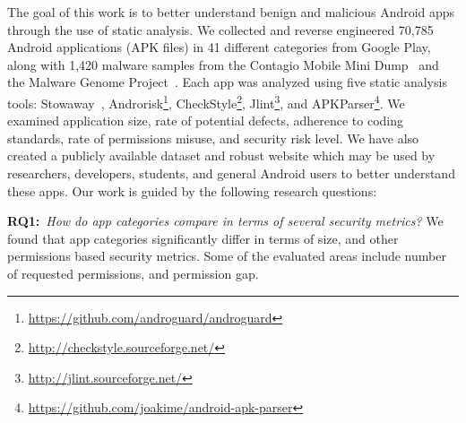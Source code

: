 \documentclass{sig-alternate-05-2015}
\begin{document}

The goal of this work is to better understand benign and malicious Android apps through the use of static analysis. We collected and reverse engineered 70,785  Android applications (APK files) in 41 different categories from Google Play, along with 1,420 malware samples from the Contagio Mobile Mini Dump~\cite{contagio_url} and the Malware Genome Project~\cite{Zhou:2012:DAM:2310656.2310710}. Each app was analyzed using five static analysis tools: Stowaway~\cite{Felt:2011:APD:2046707.2046779}, Androrisk\footnote{\url{https://github.com/androguard/androguard}}, CheckStyle\footnote{\url{http://checkstyle.sourceforge.net/}}, Jlint\footnote{\url{http://jlint.sourceforge.net/}}, and APKParser\footnote{\url{https://github.com/joakime/android-apk-parser}}. We examined application size, rate of potential defects, adherence to coding standards, rate of permissions misuse, and security risk level. We have also created a publicly available dataset and robust website which may be used by researchers, developers, students, and general Android users to better understand these apps. Our work is guided by the following research questions:


\noindent
\textbf{RQ1:}~\emph{How do app categories compare in terms of several security metrics?} We found that app categories significantly differ in terms of size, and other permissions based security metrics. Some of the evaluated areas include number of requested permissions, and permission gap.


\end{document}
